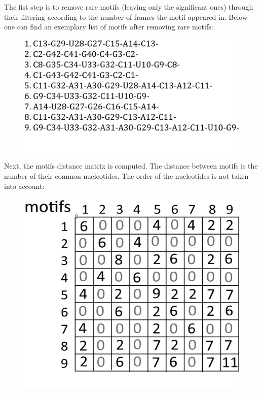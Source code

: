 \documentclass[12pt]{article}
\begin{document}
The fist step is to remove rare motifs (leaving only the significant ones) through their filtering according to the number of frames the motif appeared in. Below one can find an exemplary list of motifs after removing rare motifs:

\begin{figure}[h!]
\centering
\includegraphics[scale=1]{./pictures/cluster_motif_step1.png}
\label{MotifsClusteringStep1}
\end{figure}

Next, the motifs distance matrix is computed. The distance between motifs is the number of their common nucleotides. The order of the nucleotides is not taken into account:
\begin{figure}[h!]
\centering
\includegraphics[scale=0.6]{./pictures/cluster_motif_step2.png}
\label{MotifsClusteringStep2}
\end{figure}
\end{document}
